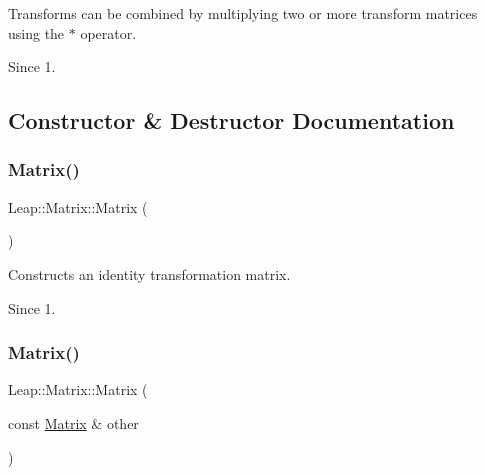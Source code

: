 Transforms can be combined by multiplying two or more transform matrices using the $\ast$ operator. \begin{DoxySince}{Since}
1. 
\end{DoxySince}


\subsection{Constructor \& Destructor Documentation}
\mbox{\label{struct_leap_1_1_matrix_a4d6481d902815a4cb8d3982fed44499c}} 
\subsubsection{\texorpdfstring{Matrix()}{Matrix()}\hspace{0.1cm}{\footnotesize\ttfamily [1/6]}}
{\footnotesize\ttfamily Leap\+::\+Matrix\+::\+Matrix (\begin{DoxyParamCaption}{ }\end{DoxyParamCaption})\hspace{0.3cm}{\ttfamily [inline]}}

Constructs an identity transformation matrix.


\begin{DoxyCodeInclude}
\end{DoxyCodeInclude}


\begin{DoxySince}{Since}
1. 
\end{DoxySince}
\mbox{\label{struct_leap_1_1_matrix_a21ac99c16f55dbbb9295254fd4deb0ea}} 
\subsubsection{\texorpdfstring{Matrix()}{Matrix()}\hspace{0.1cm}{\footnotesize\ttfamily [2/6]}}
{\footnotesize\ttfamily Leap\+::\+Matrix\+::\+Matrix (\begin{DoxyParamCaption}\item[{const \hyperlink{struct_leap_1_1_matrix}{Matrix} \&}]{other }\end{DoxyParamCaption})\hspace{0.3cm}{\ttfamily [inline]}}

